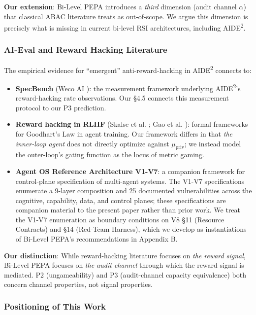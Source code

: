 \textbf{Our extension}: Bi-Level PEPA introduces a \emph{third} dimension (audit channel $\alpha$) that classical ABAC literature treats as out-of-scope. We argue this dimension is precisely what is missing in current bi-level RSI architectures, including AIDE\textsuperscript{2}.

\subsubsection{AI-Eval and Reward Hacking Literature}

The empirical evidence for ``emergent'' anti-reward-hacking in AIDE\textsuperscript{2} connects to:
\begin{itemize}
    \item \textbf{SpecBench} (Weco AI \cite{weco2024specbench}): the measurement framework underlying AIDE\textsuperscript{2}'s reward-hacking rate observations. Our \S4.5 connects this measurement protocol to our P3 prediction.
    \item \textbf{Reward hacking in RLHF} (Skalse et al. \cite{skalse2022rewardhacking}; Gao et al. \cite{gao2023rewardhackingllms}): formal frameworks for Goodhart's Law in agent training. Our framework differs in that \emph{the inner-loop agent} does not directly optimize against $\mu_{\text{priv}}$; we instead model the outer-loop's gating function as the locus of metric gaming.
    \item \textbf{Agent OS Reference Architecture V1-V7}: a companion framework for control-plane specification of multi-agent systems. The V1-V7 specifications enumerate a 9-layer composition and 25 documented vulnerabilities across the cognitive, capability, data, and control planes; these specifications are companion material to the present paper rather than prior work. We treat the V1-V7 enumeration as boundary conditions on V8 \S11 (Resource Contracts) and \S14 (Red-Team Harness), which we develop as instantiations of Bi-Level PEPA's recommendations in Appendix B.
\end{itemize}

\textbf{Our distinction}: While reward-hacking literature focuses on \emph{the reward signal}, Bi-Level PEPA focuses on \emph{the audit channel} through which the reward signal is mediated. P2 (ungameability) and P3 (audit-channel capacity equivalence) both concern channel properties, not signal properties.

\subsubsection{Positioning of This Work}

